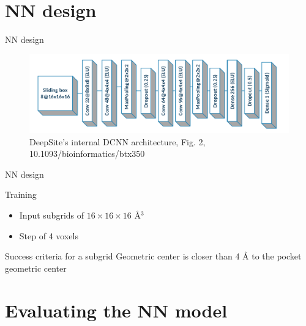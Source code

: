 \documentclass{beamer}
\begin{document}
\section{NN design}

\begin{frame}{NN design}
  \begin{figure}[h]
    \includegraphics[width=1\textwidth]{deepsite_dcnn_architecture}
    \caption{DeepSite’s internal DCNN architecture, Fig. 2, 10.1093/bioinformatics/btx350}
  \end{figure}
\end{frame}

\begin{frame}{NN design}
  \begin{block}{Training}
    \begin{itemize}
      \item Input subgrids of $16 \times 16 \times 16$ \AA$^3$
      \item Step of 4 voxels
    \end{itemize}
  \end{block}
  \begin{block}{Success criteria for a subgrid}
    Geometric center is closer than 4 Å to the pocket geometric center
  \end{block}
\end{frame}

\section{Evaluating the NN model}
\end{document}
